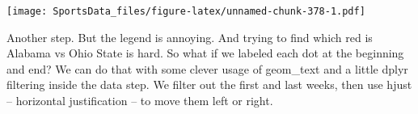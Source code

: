 \documentclass[
]{book}
\newenvironment{Shaded}{\begin{snugshade}}{\end{snugshade}}
\newcommand{\DataTypeTok}[1]{\textcolor[rgb]{0.13,0.29,0.53}{#1}}
\newcommand{\DecValTok}[1]{\textcolor[rgb]{0.00,0.00,0.81}{#1}}
\newcommand{\FloatTok}[1]{\textcolor[rgb]{0.00,0.00,0.81}{#1}}
\newcommand{\KeywordTok}[1]{\textcolor[rgb]{0.13,0.29,0.53}{\textbf{#1}}}
\newcommand{\NormalTok}[1]{#1}
\newcommand{\OperatorTok}[1]{\textcolor[rgb]{0.81,0.36,0.00}{\textbf{#1}}}
\newcommand{\StringTok}[1]{\textcolor[rgb]{0.31,0.60,0.02}{#1}}
\begin{document}
\texttt{[image: SportsData\_files/figure-latex/unnamed-chunk-378-1.pdf]}

Another step. But the legend is annoying. And trying to find which red is Alabama vs Ohio State is hard. So what if we labeled each dot at the beginning and end? We can do that with some clever usage of geom\_text and a little dplyr filtering inside the data step. We filter out the first and last weeks, then use hjust -- horizontal justification -- to move them left or right.

\begin{Shaded}
\end{Shaded}
\end{document}
